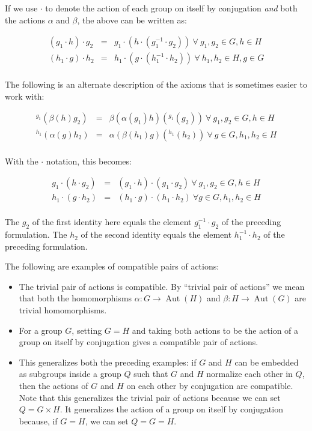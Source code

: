 If we use $\cdot$ to denote the action of each group on itself by
conjugation {\em and} both the actions $\alpha$ and $\beta$, the above
can be written as:

\begin{eqnarray*}
  (g_1 \cdot h) \cdot g_2 & = & g_1 \cdot (h \cdot (g_1^{-1} \cdot g_2)) \ \forall \ g_1,g_2 \in G, h \in H\\
  (h_1 \cdot g) \cdot h_2 & = & h_1 \cdot (g \cdot (h_1^{-1} \cdot h_2)) \ \forall \ h_1,h_2 \in H, g \in G\\
\end{eqnarray*}

The following is an alternate description of the axioms that is
sometimes easier to work with:

\begin{eqnarray*}
  {}^{g_1}(\beta(h)g_2) & = & \beta(\alpha(g_1)h)({}^{g_1}(g_2)) \ \forall \ g_1,g_2 \in G, h \in H\\ 
  {}^{h_1}(\alpha(g)h_2) & = & \alpha(\beta(h_1)g)({}^{h_1}(h_2)) \ \forall \ g \in G, h_1, h_2 \in H\\
\end{eqnarray*}

With the $\cdot$ notation, this becomes:

\begin{eqnarray*}
  g_1 \cdot (h \cdot g_2) & = & (g_1 \cdot h) \cdot (g_1 \cdot g_2) \ \forall \ g_1,g_2 \in G, h \in H\\
  h_1 \cdot (g \cdot h_2) & = & (h_1 \cdot g) \cdot (h_1 \cdot h_2) \ \forall g \in G, h_1,h_2 \in H\\
\end{eqnarray*}

The $g_2$ of the first identity here equals the element $g_1^{-1}
\cdot g_2$ of the preceding formulation. The $h_2$ of the second
identity equals the element $h_1^{-1} \cdot h_2$ of the
preceding formulation.

The following are examples of compatible pairs of actions:

\begin{itemize}
\item The trivial pair of actions is compatible. By ``trivial pair of
  actions'' we mean that both the homomorphisms $\alpha:G \to
  \operatorname{Aut}(H)$ and $\beta:H \to \operatorname{Aut}(G)$ are
  trivial homomorphisms.
\item For a group $G$, setting $G = H$ and taking both actions to be
  the action of a group on itself by conjugation gives a compatible
  pair of actions.
\item This generalizes both the preceding examples: if $G$ and $H$ can
  be embedded as subgroups inside a group $Q$ such that $G$ and $H$
  normalize each other in $Q$, then the actions of $G$ and $H$ on each
  other by conjugation are compatible. Note that this generalizes the
  trivial pair of actions because we can set $Q = G \times H$. It
  generalizes the action of a group on itself by conjugation because,
  if $G = H$, we can set $Q = G = H$.
\end{itemize}

